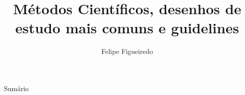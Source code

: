 \documentclass{beamer}
\title%
{Métodos Científicos, desenhos de estudo mais comuns e guidelines}
\subtitle
{} %
\author%
{Felipe Figueiredo}%
\institute[INTO] %
{Instituto Nacional de Traumatologia e Ortopedia
}
\date%
{}
\begin{document}
\begin{frame}
  \titlepage
\end{frame}

\begin{frame}{Sumário}
  \tableofcontents
\end{frame}








\end{document}

